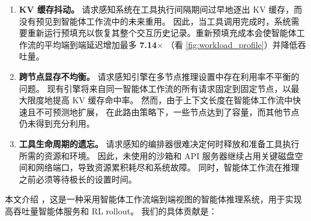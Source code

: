 \begin{enumerate}[itemsep=1pt,topsep=2pt,leftmargin=*]
\item
\textbf{KV 缓存抖动。} 请求感知系统在工具执行间隔期间过早地逐出 KV 缓存，而没有预见到智能体工作流中的未来重用。
因此，当工具调用完成时，系统需要重新运行预填充以恢复其整个交互历史记录。重新预填充成本会使智能体工作流的平均端到端延迟增加最多 \textbf{7.14$\times$} （看 \autoref{fig:workload_profile}）并降低吞吐量。

\item
\textbf{跨节点显存不均衡。} 请求感知引擎在多节点推理设置中存在利用率不平衡的问题。
现有引擎将来自同一智能体工作流的所有请求固定到固定节点，以最大限度地提高 KV 缓存命中率。
然而，由于上下文长度在智能体工作流中快速且不可预测地扩展，
在此路由策略下，一些节点达到了容量，而其他节点仍未得到充分利用。

\item
\textbf{工具生命周期的遗忘。}
请求感知的编排器很难决定何时释放和准备工具执行所需的资源和环境。
因此，未使用的沙箱和 API 服务器继续占用关键磁盘空间和网络端口，导致资源累积耗尽和系统故障。
同时，智能体工作流在推理之前必须等待极长的设置时间。
\end{enumerate}

本文介绍 \ouralg，这是一种采用智能体工作流端到端视图的智能体推理系统，用于实现高吞吐量智能体服务和 RL rollout。
我们的具体贡献是：



